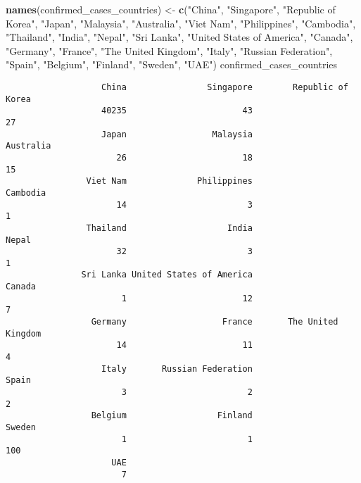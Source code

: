 \documentclass[]{article}
\newenvironment{Shaded}{\begin{snugshade}}{\end{snugshade}}
\newcommand{\KeywordTok}[1]{\textcolor[rgb]{0.13,0.29,0.53}{\textbf{#1}}}
\newcommand{\NormalTok}[1]{#1}
\newcommand{\StringTok}[1]{\textcolor[rgb]{0.31,0.60,0.02}{#1}}
\begin{document}
\begin{Shaded}
\begin{Highlighting}[]
\KeywordTok{names}\NormalTok{(confirmed_cases_countries) <-}\StringTok{ }\KeywordTok{c}\NormalTok{(}\StringTok{"China"}\NormalTok{, }\StringTok{"Singapore"}\NormalTok{, }\StringTok{"Republic of Korea"}\NormalTok{, }\StringTok{"Japan"}\NormalTok{, }
                                      \StringTok{"Malaysia"}\NormalTok{, }\StringTok{"Australia"}\NormalTok{, }\StringTok{"Viet Nam"}\NormalTok{, }\StringTok{"Philippines"}\NormalTok{, }
                                      \StringTok{"Cambodia"}\NormalTok{, }\StringTok{"Thailand"}\NormalTok{, }\StringTok{"India"}\NormalTok{, }\StringTok{"Nepal"}\NormalTok{, }\StringTok{"Sri Lanka"}\NormalTok{, }
                                      \StringTok{"United States of America"}\NormalTok{, }\StringTok{"Canada"}\NormalTok{, }\StringTok{"Germany"}\NormalTok{, }\StringTok{"France"}\NormalTok{,}
                                      \StringTok{"The United Kingdom"}\NormalTok{, }\StringTok{"Italy"}\NormalTok{, }\StringTok{"Russian Federation"}\NormalTok{, }\StringTok{"Spain"}\NormalTok{, }
                                      \StringTok{"Belgium"}\NormalTok{, }\StringTok{"Finland"}\NormalTok{, }\StringTok{"Sweden"}\NormalTok{, }\StringTok{"UAE"}\NormalTok{)}
\NormalTok{confirmed_cases_countries}
\end{Highlighting}
\end{Shaded}

\begin{verbatim}
                   China                Singapore        Republic of Korea 
                   40235                       43                       27 
                   Japan                 Malaysia                Australia 
                      26                       18                       15 
                Viet Nam              Philippines                 Cambodia 
                      14                        3                        1 
                Thailand                    India                    Nepal 
                      32                        3                        1 
               Sri Lanka United States of America                   Canada 
                       1                       12                        7 
                 Germany                   France       The United Kingdom 
                      14                       11                        4 
                   Italy       Russian Federation                    Spain 
                       3                        2                        2 
                 Belgium                  Finland                   Sweden 
                       1                        1                      100 
                     UAE 
                       7 
\end{verbatim}
\end{document}
